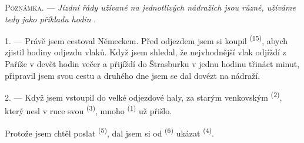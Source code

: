 %
%
%

\VUsaut{4.0mm}
\VUsaut{2.4mm}
\VUsaut{3.4mm}
\textsc{Poznámka.} --- \textit{Jízdní řády užívané na jednotlivých nádražích jsou různé,
užíváme tedy jako příkladu hodin} .

1. --- Právě jsem cestoval Německem. Před odjezdem jsem si koupil 
\textsuperscript{(15)}, abych zjistil hodiny odjezdu vlaků. Když jsem shledal, že nejvhodnější
vlak odjíždí z Paříže v devět hodin večer a přijíždí do Štrasburku v jednu hodinu třináct
minut, připravil jsem svou cestu a druhého dne jsem se dal dovézt na nádraží.

2. --- Když jsem vstoupil do velké odjezdové haly, za starým venkovským
 \textsuperscript{(2)}, který nesl v ruce svou 
\textsuperscript{(3)}, mnoho  \textsuperscript{(1)} už přišlo.

Protože jsem chtěl poslat  \textsuperscript{(5)}, dal jsem si od
 \textsuperscript{(6)} ukázat 
\textsuperscript{(4)}.

